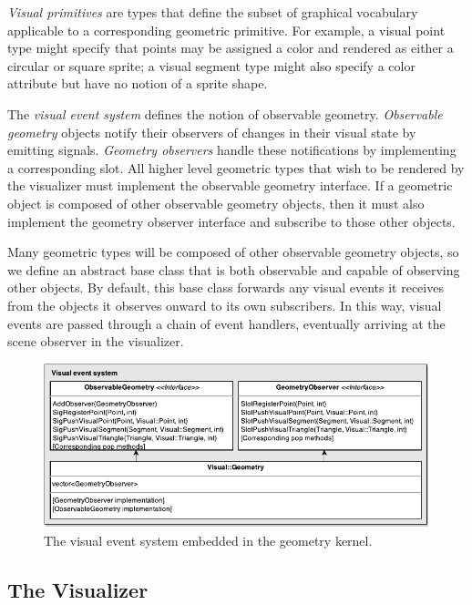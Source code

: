 \emph{Visual primitives} are types that define the subset of graphical
vocabulary applicable to a corresponding geometric primitive. For
example, a visual point type might specify that points may be assigned a color
and rendered as either a circular or square sprite; a visual segment type might
also specify a color attribute but have no notion of a sprite shape.

The \emph{visual event system} defines the notion of observable geometry.
\emph{Observable geometry} objects notify their observers of changes in their
visual state by emitting signals. \emph{Geometry observers} handle these
notifications by implementing a corresponding slot. All higher level geometric
types that wish to be rendered by the visualizer must implement the observable
geometry interface. If a geometric object is composed of other observable
geometry objects, then it must also implement the geometry observer interface
and subscribe to those other objects.

Many geometric types will be composed of other observable geometry objects, so
we define an abstract base class that is both observable and capable of
observing other objects. By default, this base class forwards any visual events
it receives from the objects it observes onward to its own subscribers. In this
way, visual events are passed through a chain of event handlers, eventually
arriving at the scene observer in the visualizer.

\begin{figure}[htb]
\centering
\includegraphics[width=\textwidth]{figures/visual-uml-6} 
\caption{The visual event system embedded in the geometry kernel.}
\label{fig:visual} 
\end{figure} 

\FloatBarrier
\subsection{The Visualizer}

